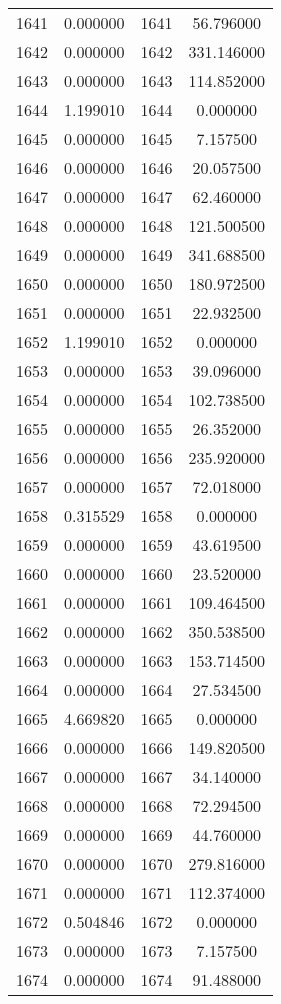 \documentclass[12pt]{article}
\begin{document}
\begin{longtable}{@{}cccc@{}}
1641 & 0.000000 & 1641 & 56.796000 \\
1642 & 0.000000 & 1642 & 331.146000 \\
1643 & 0.000000 & 1643 & 114.852000 \\
1644 & 1.199010 & 1644 & 0.000000 \\
1645 & 0.000000 & 1645 & 7.157500 \\
1646 & 0.000000 & 1646 & 20.057500 \\
1647 & 0.000000 & 1647 & 62.460000 \\
1648 & 0.000000 & 1648 & 121.500500 \\
1649 & 0.000000 & 1649 & 341.688500 \\
1650 & 0.000000 & 1650 & 180.972500 \\
1651 & 0.000000 & 1651 & 22.932500 \\
1652 & 1.199010 & 1652 & 0.000000 \\
1653 & 0.000000 & 1653 & 39.096000 \\
1654 & 0.000000 & 1654 & 102.738500 \\
1655 & 0.000000 & 1655 & 26.352000 \\
1656 & 0.000000 & 1656 & 235.920000 \\
1657 & 0.000000 & 1657 & 72.018000 \\
1658 & 0.315529 & 1658 & 0.000000 \\
1659 & 0.000000 & 1659 & 43.619500 \\
1660 & 0.000000 & 1660 & 23.520000 \\
1661 & 0.000000 & 1661 & 109.464500 \\
1662 & 0.000000 & 1662 & 350.538500 \\
1663 & 0.000000 & 1663 & 153.714500 \\
1664 & 0.000000 & 1664 & 27.534500 \\
1665 & 4.669820 & 1665 & 0.000000 \\
1666 & 0.000000 & 1666 & 149.820500 \\
1667 & 0.000000 & 1667 & 34.140000 \\
1668 & 0.000000 & 1668 & 72.294500 \\
1669 & 0.000000 & 1669 & 44.760000 \\
1670 & 0.000000 & 1670 & 279.816000 \\
1671 & 0.000000 & 1671 & 112.374000 \\
1672 & 0.504846 & 1672 & 0.000000 \\
1673 & 0.000000 & 1673 & 7.157500 \\
1674 & 0.000000 & 1674 & 91.488000 \\

\end{longtable}
\end{document}
